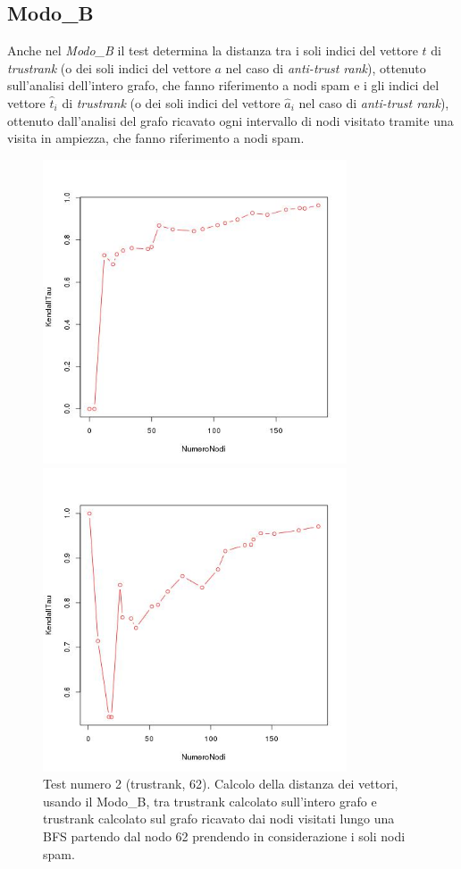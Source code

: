 \subsection{Modo\_B}
Anche nel \textit{Modo\_B} il test determina la distanza tra i soli indici del vettore \(t\) di \textit{trustrank} (o dei soli indici del vettore \(a\) nel caso di \textit{anti-trust rank}), ottenuto sull'analisi dell'intero grafo, che fanno riferimento a nodi spam e i gli indici del vettore \(\hat{t}_i\) di \textit{trustrank} (o dei soli indici del vettore \(\hat{a}_i\) nel caso di \textit{anti-trust rank}), ottenuto dall'analisi del grafo ricavato ogni intervallo di nodi visitato tramite una visita in ampiezza, che fanno riferimento a nodi spam.

\begin{figure}
\centering
 \includegraphics[height=9cm]{immagini/test2/trustrankBadNodesTestMode1_62}
 \caption{Test numero 2 (trustrank, 62). Calcolo della distanza dei vettori, usando il Modo\_B, tra trustrank calcolato sull'intero grafo e trustrank calcolato sul grafo ricavato dai nodi visitati lungo una BFS partendo dal nodo 62 prendendo in considerazione i soli nodi spam. }
 \label{fig:test2trustModoB62}
\centering
 \includegraphics[height=9cm]{immagini/test2/trustrankBadNodesTestMode1_112}

\end{figure}
